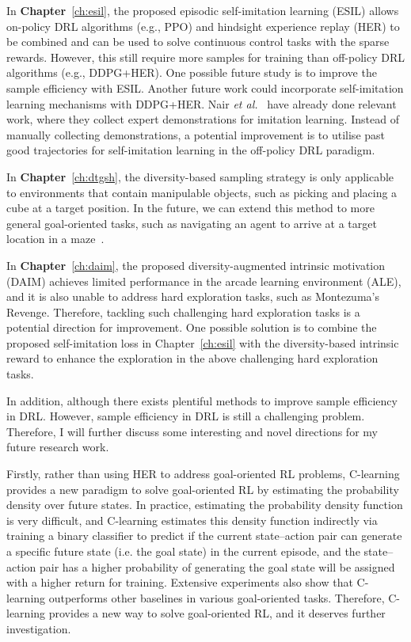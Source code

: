 In \textbf{Chapter}~\ref{ch:esil}, the proposed episodic self-imitation learning (ESIL) allows on-policy DRL algorithms (e.g., PPO) and hindsight experience replay (HER) to be combined and can be used to solve continuous control tasks with the sparse rewards. However, this still require more samples for training than off-policy DRL algorithms (e.g., DDPG+HER). One possible future study is to improve the sample efficiency with ESIL. Another future work could incorporate self-imitation learning mechanisms with DDPG+HER. Nair \textit{et al.}~\cite{nair2018overcoming} have already done relevant work, where they collect expert demonstrations for imitation learning. Instead of manually collecting demonstrations, a potential improvement is to utilise past good trajectories for self-imitation learning in the off-policy DRL paradigm.

In \textbf{Chapter}~\ref{ch:dtgsh}, the diversity-based sampling strategy is only applicable to environments that contain manipulable objects, such as picking and placing a cube at a target position. In the future, we can extend this method to more general goal-oriented tasks, such as navigating an agent to arrive at a target location in a maze~\cite{florensa2018automatic}.

In \textbf{Chapter}~\ref{ch:daim}, the proposed diversity-augmented intrinsic motivation (DAIM) achieves limited performance in the arcade learning environment (ALE), and it is also unable to address hard exploration tasks, such as Montezuma's Revenge. Therefore, tackling such challenging hard exploration tasks is a potential direction for improvement. One possible solution is to combine the proposed self-imitation loss in Chapter~\ref{ch:esil} with the diversity-based intrinsic reward to enhance the exploration in the above challenging hard exploration tasks.

In addition, although there exists plentiful methods to improve sample efficiency in DRL. However, sample efficiency in DRL is still a challenging problem. Therefore, I will further discuss some interesting and novel directions for my future research work.

Firstly, rather than using HER to address goal-oriented RL problems, C-learning~\cite{eysenbach2020c} provides a new paradigm to solve goal-oriented RL by estimating the probability density over future states. In practice, estimating the probability density function is very difficult, and C-learning estimates this density function indirectly via training a binary classifier to predict if the current state--action pair can generate a specific future state (i.e. the goal state) in the current episode, and the state--action pair has a higher probability of generating the goal state will be assigned with a higher return for training. Extensive experiments also show that C-learning outperforms other baselines in various goal-oriented tasks. Therefore, C-learning provides a new way to solve goal-oriented RL, and it deserves further investigation.

